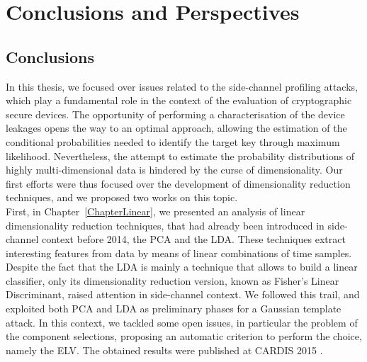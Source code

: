 
\chapter{Conclusions and Perspectives} %

\label{ChapterConclusions}



\section{Conclusions}
In this thesis, we focused over issues related to the side-channel profiling attacks, which play a fundamental role in the context of the evaluation of cryptographic secure devices. The opportunity of performing a characterisation of the device leakages opens the way to an optimal approach, allowing the estimation of the conditional probabilities needed to identify the target key through maximum likelihood. Nevertheless, the attempt to estimate the probability distributions of highly multi-dimensional data is hindered by the curse of dimensionality. Our first efforts were thus
focused over the development of dimensionality reduction techniques, and we proposed two works on this topic.\\
 
First, in Chapter~\ref{ChapterLinear}, we presented an analysis of linear dimensionality reduction techniques, that had already been introduced in side-channel context before 2014, the PCA and the LDA. These techniques extract interesting features from data by means of linear combinations of time samples. Despite the fact that the LDA is mainly a technique that allows to build a linear classifier, only its dimensionality reduction version, known as Fisher's Linear Discriminant, raised attention in side-channel context. We followed this trail, and exploited both PCA and LDA as preliminary phases for a Gaussian template attack. In this context, we tackled some open issues, in particular the problem of the component selections, proposing an automatic criterion to perform the choice, namely the ELV.  The obtained results were published at CARDIS 2015 \cite{Cagli2016}.\\

